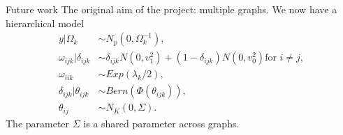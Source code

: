 \documentclass{beamer}
\begin{document}
\begin{frame}{Future work}
	The original aim of the project: multiple graphs.
	We now have a hierarchical model
	\begin{align*}
		y | \Omega_k                & \sim N_p(0, \Omega_k^{-1}),                                                          \\
		\omega_{ijk} | \delta_{ijk} & \sim \delta_{ijk} N(0, v_1^2) + (1 - \delta_{ijk}) N(0, v_0^2) \text{for } i \neq j, \\
		\omega_{iik}                & \sim Exp(\lambda_k/2),                                                               \\
		\delta_{ijk} | \theta_{ijk} & \sim Bern(\Phi(\theta_{ijk})),                                                       \\
		\theta_{ij}                 & \sim N_K(0, \Sigma).
	\end{align*}
	The parameter $\Sigma$ is a shared parameter across graphs.
\end{frame}
\end{document}
